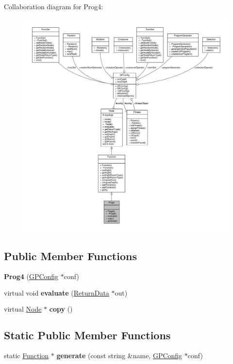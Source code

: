 Collaboration diagram for Prog4\+:
\nopagebreak
\begin{figure}[H]
\begin{center}
\leavevmode
\includegraphics[width=350pt]{classProg4__coll__graph}
\end{center}
\end{figure}
\subsection*{Public Member Functions}
\begin{DoxyCompactItemize}
\item 
\hypertarget{classProg4_a5e86ff04b5e8652f917f2a838fa6b0aa}{}\label{classProg4_a5e86ff04b5e8652f917f2a838fa6b0aa} 
{\bfseries Prog4} (\hyperlink{classGPConfig}{G\+P\+Config} $\ast$conf)
\item 
\hypertarget{classProg4_a2bd6ea497e7e6d4ab5c109dd37ced620}{}\label{classProg4_a2bd6ea497e7e6d4ab5c109dd37ced620} 
virtual void {\bfseries evaluate} (\hyperlink{classReturnData}{Return\+Data} $\ast$out)
\item 
\hypertarget{classProg4_a855801b596cb17fe45c8fde5c701ea08}{}\label{classProg4_a855801b596cb17fe45c8fde5c701ea08} 
virtual \hyperlink{classNode}{Node} $\ast$ {\bfseries copy} ()
\end{DoxyCompactItemize}
\subsection*{Static Public Member Functions}
\begin{DoxyCompactItemize}
\item 
\hypertarget{classProg4_a4a828b4aadd8faac2f642ab2bdd45d58}{}\label{classProg4_a4a828b4aadd8faac2f642ab2bdd45d58} 
static \hyperlink{classFunction}{Function} $\ast$ {\bfseries generate} (const string \&name, \hyperlink{classGPConfig}{G\+P\+Config} $\ast$conf)
\end{DoxyCompactItemize}
